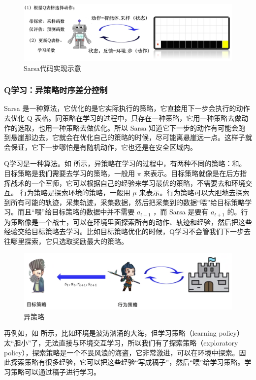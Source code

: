 \begin{figure}[htb]
	\centering
	\includegraphics[width=0.6\linewidth]{res/ch3/3.16}
	\caption{Sarsa代码实现示意}
	\label{fig:sarsa_code}
\end{figure}

\subsubsection{Q学习：异策略时序差分控制} 

Sarsa 是一种算法，它优化的是它实际执行的策略，它直接用下一步会执行的动作去优化 Q 表格。同策略在学习的过程中，只存在一种策略，它用一种策略去做动作的选取，也用一种策略去做优化。所以 Sarsa 知道它下一步的动作有可能会跑到悬崖那边去，它就会在优化自己的策略的时候，尽可能离悬崖远一点。这样子就会保证，它下一步哪怕是有随机动作，它也还是在安全区域内。

Q学习是一种算法。如 所示，异策略在学习的过程中，有两种不同的策略：和。
目标策略是我们需要去学习的策略，一般用 $\pi$ 来表示。目标策略就像是在后方指挥战术的一个军师，它可以根据自己的经验来学习最优的策略，不需要去和环境交互。
行为策略是探索环境的策略，一般用 $\mu$ 来表示。行为策略可以大胆地去探索到所有可能的轨迹，采集轨迹，采集数据，然后把采集到的数据“喂”给目标策略学习。而且“喂”给目标策略的数据中并不需要 $a_{t+1}$ ，而 Sarsa 是要有 $a_{t+1}$ 的。行为策略像是一个战士，可以在环境里面探索所有的动作、轨迹和经验，然后把这些经验交给目标策略去学习。比如目标策略优化的时候，Q学习不会管我们下一步去往哪里探索，它只选取奖励最大的策略。


\begin{figure}[htb]
	\centering
	\includegraphics[width=0.5\linewidth]{res/ch3/3.17}
	\caption{异策略}
	\label{fig:off-policy_1}
\end{figure}

再例如，如 所示，比如环境是波涛汹涌的大海，但学习策略（learning policy）太“胆小”了，无法直接与环境交互学习，所以我们有了探索策略（exploratory policy），探索策略是一个不畏风浪的海盗，它非常激进，可以在环境中探索。因此探索策略有很多经验，它可以把这些经验“写成稿子”，然后“喂”给学习策略。学习策略可以通过稿子进行学习。

